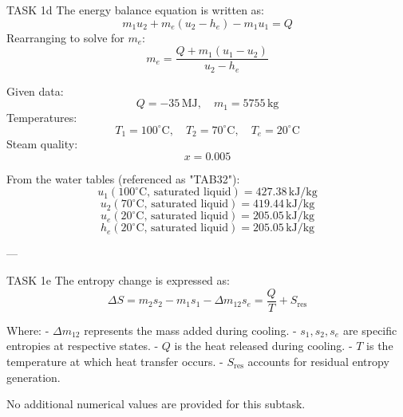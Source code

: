 TASK 1d  
The energy balance equation is written as:  
\[
m_1 u_2 + m_e (u_2 - h_e) - m_1 u_1 = Q
\]  
Rearranging to solve for \( m_e \):  
\[
m_e = \frac{Q + m_1 (u_1 - u_2)}{u_2 - h_e}
\]  

Given data:  
\[
Q = -35 \, \text{MJ}, \quad m_1 = 5755 \, \text{kg}
\]  
Temperatures:  
\[
T_1 = 100^\circ\text{C}, \quad T_2 = 70^\circ\text{C}, \quad T_e = 20^\circ\text{C}
\]  
Steam quality:  
\[
x = 0.005
\]  

From the water tables (referenced as "TAB32"):  
\[
u_1 (100^\circ\text{C}, \, \text{saturated liquid}) = 427.38 \, \text{kJ/kg}
\]  
\[
u_2 (70^\circ\text{C}, \, \text{saturated liquid}) = 419.44 \, \text{kJ/kg}
\]  
\[
u_e (20^\circ\text{C}, \, \text{saturated liquid}) = 205.05 \, \text{kJ/kg}
\]  
\[
h_e (20^\circ\text{C}, \, \text{saturated liquid}) = 205.05 \, \text{kJ/kg}
\]  

---

TASK 1e  
The entropy change is expressed as:  
\[
\Delta S = m_2 s_2 - m_1 s_1 - \Delta m_{12} s_e = \frac{Q}{T} + S_{\text{res}}
\]  

Where:  
- \( \Delta m_{12} \) represents the mass added during cooling.  
- \( s_1, s_2, s_e \) are specific entropies at respective states.  
- \( Q \) is the heat released during cooling.  
- \( T \) is the temperature at which heat transfer occurs.  
- \( S_{\text{res}} \) accounts for residual entropy generation.  

No additional numerical values are provided for this subtask.